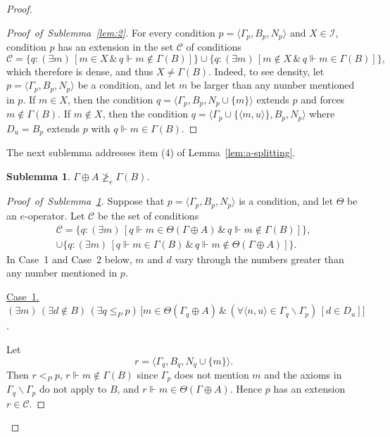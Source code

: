 \documentclass[11pt]{amsart}
\newtheorem{sublemma}{Sublemma}
\newcommand{\QA}[1]{(\forall{#1})\,}
\newcommand{\QE}[1]{(\exists{#1})\,}
\begin{document}
\begin{proof}
\begin{proof}[Proof~of~Sublemma~\ref{lem:2}] 
For every condition $p=\langle \Gamma_p, B_p, N_p\rangle$ and $X \in 
\mathcal{I}$, condition $p$ has an extension in the set $\mathcal{C}$ of 
conditions 
\[
\mathcal{C}=\{q: \QE{m} \left[m \in X \,\&\, 
q \Vdash m \notin \Gamma(B)\right]\}
\cup \{q: \QE{m} \left[m \notin X \,\&\, q \Vdash m \in \Gamma(B)\right]\},
\]
which therefore is dense, and thus $X \ne \Gamma(B)$. Indeed, to see density, 
let $p=\langle \Gamma_p, B_p, N_p\rangle$ be a condition, and let $m$ be 
larger than any number mentioned in $p$. If $m\in X$, then the condition 
$q=\langle \Gamma_p, B_p, N_p \cup \{m\} \rangle$ extends $p$ and forces $m 
\notin \Gamma(B)$. If $m\notin X$, then the condition $q=\langle \Gamma_p\cup 
\{\langle m, u\rangle\}, B_p, N_p  \rangle$ where $D_u = B_p$ extends $p$ with $q \Vdash m \in 
\Gamma(B)$. 
\end{proof}

The next sublemma addresses item (4) of Lemma~\ref{lem:a-splitting}. 

\begin{sublemma}\label{lem:3}
$\Gamma\oplus A \ngeq_e \Gamma(B)$.
\end{sublemma}

\begin{proof}[Proof~of~Sublemma~\ref{lem:3}] 
Suppose that $p=\langle \Gamma_p, B_p, N_p\rangle$ is a condition, and let 
$\Theta$ be an $e$-operator. Let $\mathcal{C}$ be the set of conditions 
\begin{multline*}
\mathcal{C}=\{q: \QE{m} \left[ q \Vdash m \in \Theta(\Gamma \oplus A) \,\&\,
q \Vdash m \notin \Gamma(B)\right]\},\\
\cup \{q: \QE{m} \left[q \Vdash m \in \Gamma(B) \,\&\, q \Vdash m \notin 
\Theta(\Gamma \oplus A) \right]\}.
\end{multline*}
In Case~1 and Case~2 below, $m$ and $d$ vary through the numbers greater than 
any number mentioned in $p$. 

\underline{Case~1.} $\QE{m}\QE{d \notin B}\QE{q \leq_P p}
\bigl[m \in \Theta(\Gamma_q\oplus A) \,\&\, \QA{\langle n, u 
\rangle \in \Gamma_q \smallsetminus \Gamma_p}[d \in D_u]\bigr]$.

Let
\[
r=\langle \Gamma_q, B_q,  N_q \cup\{m\}\rangle.
\]
Then $r <_P p$, $r\Vdash   m \notin \Gamma(B)$ since $\Gamma_p$ does not 
mention $m$ and the axioms in $\Gamma_q \smallsetminus \Gamma_p$ do not apply 
to $B$, and $ r \Vdash m \in \Theta(\Gamma \oplus A)$. Hence $p$ has an 
extension $r \in \mathcal{C}$. 


\end{proof}
\end{proof}
\end{document}
